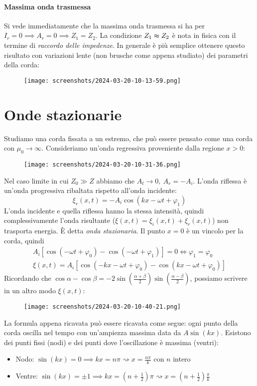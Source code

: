 \paragraph{Massima onda trasmessa}
Si vede immediatamente che la massima onda trasmessa si ha per \(I_r=0 \implies A_r = 0 \implies Z_1 = Z_2\). La condizione \(Z_1\thickapprox Z_2\) è nota in fisica con il termine di \emph{raccordo delle impedenze}. In generale è più semplice ottenere questo risultato con variazioni lente (non brusche come appena studiato) dei parametri della corda:
\begin{figure}[H]
	\centering
	\texttt{[image: screenshots/2024-03-20-10-13-59.png]}
\end{figure}

\section{Onde stazionarie}
Studiamo una corda fissata a un estremo, che può essere pensato come una corda con \(\mu _0 \to \infty \). Consideriamo un'onda regressiva proveniente dalla regione \(x>0\):
\begin{figure}[H]
	\centering
	\texttt{[image: screenshots/2024-03-20-10-31-36.png]}
\end{figure}
Nel caso limite in cui \(Z_0 \gg Z\) abbiamo che \(A_t \to 0,\ A_r=-A_i\). L'onda riflessa è un'onda progressiva ribaltata rispetto all'onda incidente:
\[
	\xi _r(x,t)=-A_i \cos (kx -\omega t + \varphi _1)
\]
L'onda incidente e quella riflessa hanno la stessa intensità, quindi complessivamente l'onda risultante (\(\xi (x,t) = \xi _i (x,t)+\xi _r(x,t)\)) non trasporta energia. È detta \emph{onda stazionaria}. Il punto \(x=0\) è un vincolo per la corda, quindi
\begin{gather*}
	A_i [\cos (-\omega t + \varphi _0) - \cos (-\omega t + \varphi _1)]=0 \iff \varphi _1 = \varphi _0\\
	\xi (x,t) = A_i [\cos (-kx -\omega t + \varphi _0) - \cos (kx- \omega t + \varphi _0)]
\end{gather*}
Ricordando che \(\cos \alpha - \cos \beta  = -2 \sin \left( \frac{\alpha +\beta }{2} \right)\sin \left(\frac{\alpha - \beta }{2}\right)  \), possiamo scrivere in un altro modo \(\xi (x,t)\):
\begin{figure}[H]
	\centering
	\texttt{[image: screenshots/2024-03-20-10-40-21.png]}
\end{figure}
La formula appena ricavata può essere ricavata come segue: ogni punto della corda oscilla nel tempo con un'ampiezza massima data da \(A \sin (kx)\). Esistono dei punti fissi (nodi) e dei punti dove l'oscillazione è massima (ventri):
\begin{itemize}
	\item Nodo: \(\sin (kx) = 0 \implies kx = n\pi \rightsquigarrow x= \frac{n \pi }{k}\) con \(n\) intero
	\item Ventre: \(\sin (kx) = \pm 1 \implies kx = \left( n+ \frac{1}{2} \right) \pi \rightsquigarrow x = \left( n + \frac{1}{2} \right) \frac{\pi }{k}  \)  
\end{itemize}

